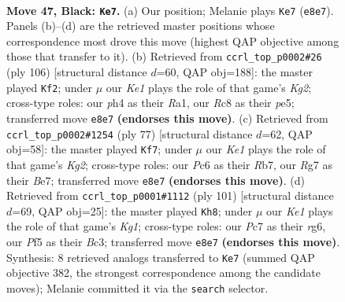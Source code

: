 \documentclass[11pt]{article}
\begin{document}
\clearpage

\begin{figure}[p]\centering
\begin{subfigure}{0.46\textwidth}\centering
\resizebox{\linewidth}{!}{%
\newchessgame
\chessboard[
  setfen={2r1k3/p1p3r1/P1p3p1/2Pb1pRp/1P3P1P/8/5K2/RN6 b - - 17 47},
  showmover=false,
  pgfstyle=straightmove, color=movearrow, markmove={e8-e7}
]}
\caption{}
\end{subfigure}\hfill
\begin{subfigure}{0.46\textwidth}\centering
\resizebox{\linewidth}{!}{%
\newchessgame
\chessboard[
  setfen={8/4kp2/3p3p/1r1PpPp1/rPR3P1/P6P/6K1/R7 w - - 1 54},
  showmover=false,
  pgfstyle=straightmove, color=movearrow, markmove={g2-f2}
]}
\caption{}
\end{subfigure}
\\[4pt]
\begin{subfigure}{0.46\textwidth}\centering
\resizebox{\linewidth}{!}{%
\newchessgame
\chessboard[
  setfen={8/1r2b1k1/1pRp2pp/pP2p3/P2pP3/B5P1/4K2P/8 b - - 5 39},
  showmover=false,
  pgfstyle=straightmove, color=movearrow, markmove={g7-f7}
]}
\caption{}
\end{subfigure}\hfill
\begin{subfigure}{0.46\textwidth}\centering
\resizebox{\linewidth}{!}{%
\newchessgame
\chessboard[
  setfen={1r4k1/r3p3/3p2R1/2pP1BP1/2P4P/p1b1P3/R5K1/8 b - - 8 51},
  showmover=false,
  pgfstyle=straightmove, color=movearrow, markmove={g8-h8}
]}
\caption{}
\end{subfigure}
\caption{\textbf{Move 47, Black: \texttt{Ke7}.} (a) Our position; Melanie plays \texttt{Ke7} (\texttt{e8e7}). Panels (b)--(d) are the retrieved master positions whose correspondence most drove this move (highest QAP objective among those that transfer to it). (b) Retrieved from \texttt{ccrl\_top\_p0002\#26} (ply 106) [structural distance $d$=60, QAP obj=188]: the master played \texttt{Kf2}; under $\mu$ our \emph{Ke1} plays the role of that game's \emph{Kg2}; cross-type roles: our \emph{p}h4 as their \emph{R}a1, our \emph{R}c8 as their \emph{p}e5; transferred move \texttt{e8e7} \textbf{(endorses this move)}. (c) Retrieved from \texttt{ccrl\_top\_p0002\#1254} (ply 77) [structural distance $d$=62, QAP obj=58]: the master played \texttt{Kf7}; under $\mu$ our \emph{Ke1} plays the role of that game's \emph{Kg2}; cross-type roles: our \emph{P}c6 as their \emph{R}b7, our \emph{R}g7 as their \emph{B}e7; transferred move \texttt{e8e7} \textbf{(endorses this move)}. (d) Retrieved from \texttt{ccrl\_top\_p0001\#1112} (ply 101) [structural distance $d$=69, QAP obj=25]: the master played \texttt{Kh8}; under $\mu$ our \emph{Ke1} plays the role of that game's \emph{Kg1}; cross-type roles: our \emph{P}c7 as their \emph{r}g6, our \emph{P}f5 as their \emph{B}c3; transferred move \texttt{e8e7} \textbf{(endorses this move)}. Synthesis: 8 retrieved analogs transferred to \texttt{Ke7} (summed QAP objective 382, the strongest correspondence among the candidate moves); Melanie committed it via the \texttt{search} selector.}
\label{fig:thought-m93}
\end{figure}
\end{document}
